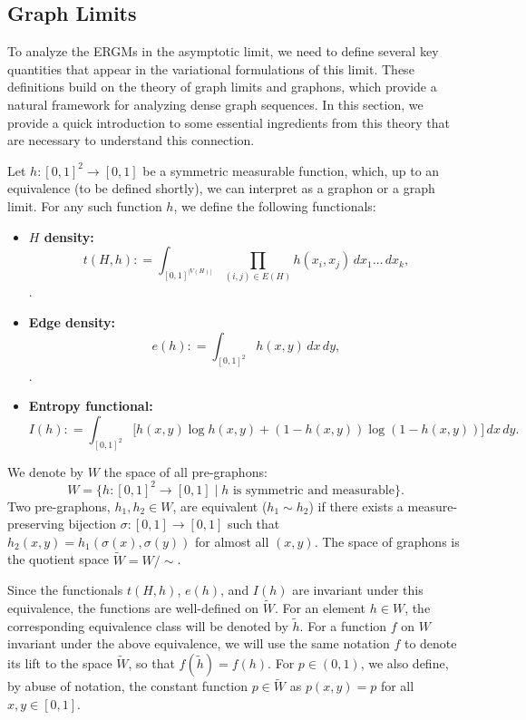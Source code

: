 \documentclass[12pt]{article}
\numberwithin{equation}{section}
\begin{document}
\subsection{Graph Limits \label{sec:graph_limit}}


To analyze the ERGMs in the asymptotic limit, we need to define several key quantities that appear in the variational formulations of this limit. These definitions build on the theory of graph limits and graphons, which provide a natural framework for analyzing dense graph sequences. In this section, we provide a quick introduction to some essential ingredients from this theory that are necessary to understand this connection.

Let $h: [0,1]^2 \rightarrow [0,1]$ be a symmetric measurable function, which, up to an equivalence (to be defined shortly),  we can interpret as a graphon or a graph limit. For any such function $h$, we define the following functionals:

\begin{itemize}
    \item \textbf{\(H\) density:} 
    \begin{equation}t(H,h): = \int_{[0,1]^{|V(H)|}} \prod _{(i,j)\in E(H)}h(x_i,x_j) \, dx_1 \ldots \, dx_k\label{H_density},\end{equation}.
    
    \item \textbf{Edge density:} 
    \begin{equation}e(h): = \int_{[0,1]^2} h(x,y) \, dx \, dy\label{edge_density},\end{equation}.
    
    \item \textbf{Entropy functional:} 
    \begin{equation}I(h): = \int_{[0,1]^2} \Big[ h(x,y)\log h(x,y) + (1-h(x,y))\log(1-h(x,y)) \Big] \, dx \, dy\label{entropy_func}.\end{equation}
\end{itemize}

 We denote by $W$ the space of all pre-graphons:
\[W = \{h: [0,1]^2 \rightarrow [0,1] \mid h \text{ is symmetric and measurable}\}.\]
Two pre-graphons, $h_1, h_2 \in W$, are equivalent ($h_1 \sim h_2$) if there exists a measure-preserving bijection $\sigma: [0,1] \to [0,1]$ such that $h_2(x,y) = h_1(\sigma(x),\sigma(y))$ for almost all $(x,y)$. The space of graphons is the quotient space $\tilde{W} = W/\sim$.

Since the functionals $t(H,h)$, $e(h)$, and $I(h)$ are invariant under this equivalence, the functions are well-defined on $\tilde{W}$. For an element $h\in W$, the corresponding equivalence class will be denoted by $\tilde{h}$. For a function $f$ on $W$ invariant under the above equivalence, we will use the same notation $f$ to denote its lift to the space $\tilde{W}$, so that $f(\tilde{h}) = f(h)$. For $p \in (0,1)$, we also define, by abuse of notation, the constant function $p \in \tilde{W}$ as $p(x,y) = p$ for all $x,y \in [0,1]$.
\end{document}
